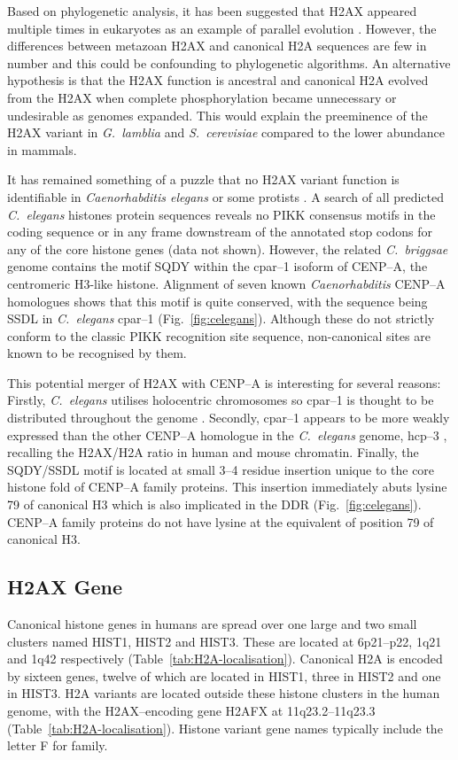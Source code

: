 \documentclass[graybox]{svmult}
\begin{document}
Based on phylogenetic analysis, it has been suggested that H2AX appeared multiple times in
eukaryotes as an example of parallel evolution \cite{HSM03}. However, the differences between
metazoan H2AX and canonical H2A sequences are few in number and this could be confounding to
phylogenetic algorithms. An alternative hypothesis is that the  H2AX function is ancestral and
canonical H2A evolved from the H2AX when complete phosphorylation became unnecessary or undesirable
as genomes expanded. This would explain the preeminence of the H2AX variant in \emph{G.\ lamblia}
and \emph{S.\ cerevisiae} compared to the lower abundance in mammals.

It has remained something of a puzzle that no H2AX variant function is identifiable in
\emph{Caenorhabditis elegans} \cite{HSM03} or some protists \cite{SJN06}. A search of all predicted
\emph{C.\ elegans} histones protein sequences reveals no PIKK consensus motifs in the coding
sequence or in any frame downstream of the annotated stop codons for any of the core histone genes
(data not shown). However, the related \emph{C.\ briggsae} genome contains the motif SQDY within the
\mbox{cpar--1} isoform of \mbox{CENP--A}, the centromeric \mbox{H3-like} histone. Alignment of seven
known \emph{Caenorhabditis} \mbox{CENP--A} homologues shows that this motif is quite conserved, with
the sequence being SSDL in \emph{C.\ elegans} \mbox{cpar--1} (Fig.\ \ref{fig:celegans}). Although
these do not strictly conform to the classic PIKK recognition site sequence, non-canonical sites are
known to be recognised by them\cite{SYC+05}.

This potential merger of H2AX with \mbox{CENP--A} is interesting for several reasons: Firstly,
\emph{C.\ elegans} utilises holocentric chromosomes so \mbox{cpar--1} is thought to be distributed
throughout the genome \cite{MMH+05}. Secondly, \mbox{cpar--1} appears to be more weakly expressed
than the other \mbox{CENP--A} homologue in the \emph{C.\ elegans} genome, \mbox{hcp--3} \cite{MMH+05},
recalling the H2AX/H2A ratio in human and mouse chromatin. Finally, the SQDY/SSDL motif is located
at small 3--4 residue insertion unique to the core histone fold of \mbox{CENP--A} family proteins.
This insertion immediately abuts lysine 79 of canonical H3 which is also implicated in the DDR
(Fig.\ \ref{fig:celegans})\@. \mbox{CENP--A} family proteins do not have lysine at the equivalent of
position 79 of canonical H3.

\subsection{H2AX Gene}
\label{subsec:H2AX-gene}
Canonical histone genes in humans are spread over one large and two small clusters named HIST1,
HIST2 and HIST3. These are located at 6p21--p22, 1q21 and 1q42 respectively (Table~\ref{tab:H2A-localisation}).
Canonical H2A is encoded by sixteen genes, twelve of which are located in HIST1, three in HIST2 and
one in HIST3. H2A variants are located outside these histone clusters in the human genome, with the
H2AX--encoding gene H2AFX at 11q23.2--11q23.3 \cite{IZP+94} (Table~\ref{tab:H2A-localisation}).
Histone variant gene names typically include the letter F for family.
\end{document}
